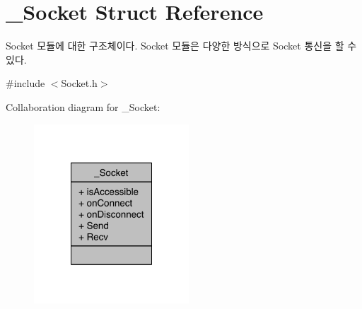 \hypertarget{struct__Socket}{\section{\-\_\-\-Socket Struct Reference}
\label{struct__Socket}
}


Socket 모듈에 대한 구조체이다. Socket 모듈은 다양한 방식으로 Socket 통신을 할 수 있다.  




{\ttfamily \#include $<$Socket.\-h$>$}



Collaboration diagram for \-\_\-\-Socket\-:\nopagebreak
\begin{figure}[H]
\begin{center}
\leavevmode
\includegraphics[width=164pt]{d7/d74/struct__Socket__coll__graph}
\end{center}
\end{figure}
